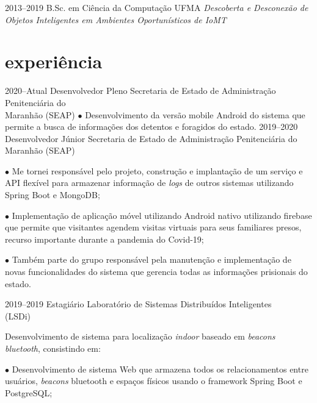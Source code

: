 \documentclass[]{../document-class/twentysecondcv}
\begin{document}
\begin{twenty}
	\twentyitem
		{2013--2019}
		{B.Sc. em Ciência da Computação}
		{UFMA}
		{\emph{Descoberta e Desconexão de Objetos Inteligentes em Ambientes Oportunísticos de IoMT}}
\end{twenty}

\section{experiência}

\begin{twenty}
	\twentyitem
		{2020--Atual} %
		{Desenvolvedor Pleno} %
		{Secretaria de Estado de Administração Penitenciária do \\\hspace*{\fill}Maranhão (SEAP)}
		{$\bullet$ Desenvolvimento da versão mobile Android do sistema que permite a busca de informações dos detentos e foragidos do estado.}
	\twentyitem
		{2019--2020} %
		{Desenvolvedor Júnior} %
		{Secretaria de Estado de Administração Penitenciária do \\\hspace*{\fill}Maranhão (SEAP)}
		{$\bullet$ Me tornei responsável pelo projeto, construção e implantação de um serviço e API flexível para armazenar informação de \textit{logs} de outros sistemas utilizando Spring Boot e MongoDB;\vskip 4pt

		$\bullet$ Implementação de aplicação móvel utilizando Android nativo utilizando firebase que permite que visitantes agendem visitas virtuais para seus familiares presos, recurso importante durante a pandemia do Covid-19;\vskip 4pt

		$\bullet$ Também parte do grupo responsável pela manutenção e implementação de novas funcionalidades do sistema que gerencia todas as informações prisionais do estado.}
	
	\twentyitem
		{2019--2019}
		{Estagiário}
		{Laboratório de Sistemas Distribuídos Inteligentes \\\hspace*{\fill}(LSDi)}
		{Desenvolvimento de sistema para localização \textit{indoor} baseado em \textit{beacons bluetooth}, consistindo em:\vskip 4pt
          
			$\bullet$ Desenvolvimento de sistema Web que armazena todos os relacionamentos entre usuários, \textit{beacons} bluetooth e espaços físicos usando o framework Spring Boot e PostgreSQL;\vskip 4pt
        
}
\end{twenty}
\end{document}
